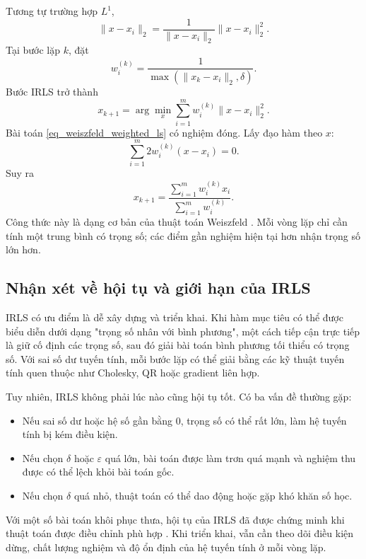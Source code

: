 Tương tự trường hợp $L^1$,
\begin{equation}
    \|x-x_i\|_2
    =
    \frac{1}{\|x-x_i\|_2}\|x-x_i\|_2^2.
    \label{eq_geometric_median_weighted}
\end{equation}
Tại bước lặp $k$, đặt
\begin{equation}
    w_i^{(k)}
    =
    \frac{1}{\max(\|x_k-x_i\|_2,\delta)}.
    \label{eq_weiszfeld_weight}
\end{equation}
Bước IRLS trở thành
\begin{equation}
    x_{k+1}
    =
    \arg\min_x
    \sum_{i=1}^{m}w_i^{(k)}\|x-x_i\|_2^2.
    \label{eq_weiszfeld_weighted_ls}
\end{equation}
Bài toán \eqref{eq_weiszfeld_weighted_ls} có nghiệm đóng. Lấy đạo hàm theo $x$:
\begin{equation}
    \sum_{i=1}^{m}2w_i^{(k)}(x-x_i)=0.
    \label{eq_weiszfeld_derivative}
\end{equation}
Suy ra
\begin{equation}
    x_{k+1}
    =
    \frac{\sum_{i=1}^{m}w_i^{(k)}x_i}
         {\sum_{i=1}^{m}w_i^{(k)}}.
    \label{eq_weiszfeld_update}
\end{equation}
Công thức này là dạng cơ bản của thuật toán Weiszfeld \cite{Weiszfeld1937}. Mỗi vòng lặp chỉ cần tính một trung bình có trọng số; các điểm gần nghiệm hiện tại hơn nhận trọng số lớn hơn.

\subsection{Nhận xét về hội tụ và giới hạn của IRLS}
\label{SUB_SEC_irls_nhan_xet}
IRLS có ưu điểm là dễ xây dựng và triển khai. Khi hàm mục tiêu có thể được biểu diễn dưới dạng "trọng số nhân với bình phương", một cách tiếp cận trực tiếp là giữ cố định các trọng số, sau đó giải bài toán bình phương tối thiểu có trọng số. Với sai số dư tuyến tính, mỗi bước lặp có thể giải bằng các kỹ thuật tuyến tính quen thuộc như Cholesky, QR hoặc gradient liên hợp.
\medskip

Tuy nhiên, IRLS không phải lúc nào cũng hội tụ tốt. Có ba vấn đề thường gặp:
\begin{itemize}
    \item Nếu sai số dư hoặc hệ số gần bằng $0$, trọng số có thể rất lớn, làm hệ tuyến tính bị kém điều kiện.
    \item Nếu chọn $\delta$ hoặc $\varepsilon$ quá lớn, bài toán được làm trơn quá mạnh và nghiệm thu được có thể lệch khỏi bài toán gốc.
    \item Nếu chọn $\delta$ quá nhỏ, thuật toán có thể dao động hoặc gặp khó khăn số học.
\end{itemize}
\medskip

Với một số bài toán khôi phục thưa, hội tụ của IRLS đã được chứng minh khi thuật toán được điều chỉnh phù hợp \cite{Daubechies2010IRLS}. Khi triển khai, vẫn cần theo dõi điều kiện dừng, chất lượng nghiệm và độ ổn định của hệ tuyến tính ở mỗi vòng lặp.
